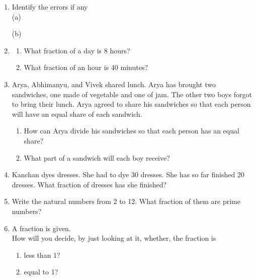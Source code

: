 \documentclass[a4paper,leqno,12pt]{amsart}
\begin{document}
\begin{enumerate}
\item Identify the errors if any \\
(a) 
\quad
(b)

\item 
\begin{enumerate}
 \item What fraction of a day is 8 hours?
 \item What fraction of an hour is 40 minutes?
\end{enumerate}

\item Arya, Abhimanyu, and Vivek shared lunch. Arya has brought two sandwiches,
one made of vegetable and one of jam. The other two boys forgot to bring their
lunch. Arya agreed to share his sandwiches so that each person will have an
equal share of each sandwich.
\begin{enumerate}
 \item How can Arya divide his sandwiches so that each person has an equal share?
 \item What part of a sandwich will each boy receive?
\end{enumerate}

\item Kanchan dyes dresses. She had to dye 30 dresses. She has so far finished 20
dresses. What fraction of dresses has she finished?

\item Write the natural numbers from 2 to 12. What fraction of them are prime numbers?

\item A fraction is given.\\
How will you decide, by just looking at it, whether, the fraction is
\begin{enumerate}
 \item less than 1?
 \item equal to 1?
\end{enumerate}


\end{enumerate}
\end{document}
